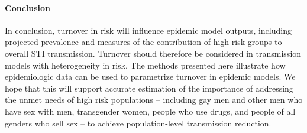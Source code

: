 \paragraph{Conclusion}
In conclusion, turnover in risk will influence
epidemic model outputs, including projected prevalence and
measures of the contribution of high risk groups to overall STI transmission.
Turnover should therefore be considered in
transmission models with heterogeneity in risk.
The methods presented here illustrate how
epidemiologic data can be used to parametrize
turnover in epidemic models.
We hope that this will support accurate estimation of
the importance of addressing the unmet needs of high risk populations
-- including
gay men and other men who have sex with men,
transgender women,
people who use drugs, and
people of all genders who sell sex
-- to achieve population-level transmission reduction.